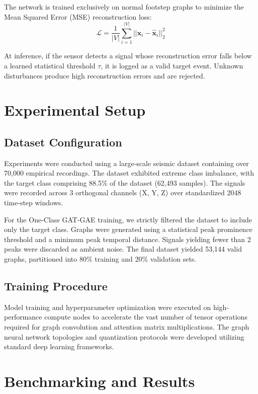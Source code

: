 \documentclass[conference, a4paper]{IEEEtran}
\begin{document}
The network is trained exclusively on normal footstep graphs to minimize the Mean Squared Error (MSE) reconstruction loss:
\begin{equation}
    \mathcal{L} = \frac{1}{|V|} \sum_{i=1}^{|V|} ||\mathbf{x}_i - \mathbf{\hat{x}}_i||_2^2
\end{equation}

At inference, if the sensor detects a signal whose reconstruction error falls below a learned statistical threshold $\tau$, it is logged as a valid target event. Unknown disturbances produce high reconstruction errors and are rejected.

\section{Experimental Setup}

\subsection{Dataset Configuration}
Experiments were conducted using a large-scale seismic dataset containing over 70,000 empirical recordings. The dataset exhibited extreme class imbalance, with the target class comprising 88.5\% of the dataset (62,493 samples). The signals were recorded across 3 orthogonal channels (X, Y, Z) over standardized 2048 time-step windows.

For the One-Class GAT-GAE training, we strictly filtered the dataset to include only the target class. Graphs were generated using a statistical peak prominence threshold and a minimum peak temporal distance. Signals yielding fewer than 2 peaks were discarded as ambient noise. The final dataset yielded 53,144 valid graphs, partitioned into 80\% training and 20\% validation sets.

\subsection{Training Procedure}
Model training and hyperparameter optimization were executed on high-performance compute nodes to accelerate the vast number of tensor operations required for graph convolution and attention matrix multiplications. The graph neural network topologies and quantization protocols were developed utilizing standard deep learning frameworks.

\section{Benchmarking and Results}
\end{document}
